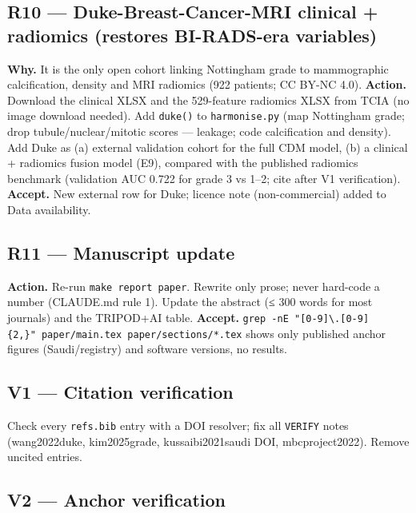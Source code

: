 \documentclass[
  10pt,
]{article}
\begin{document}
\hypertarget{r10-duke-breast-cancer-mri-clinical-radiomics-restores-bi-rads-era-variables}{%
\subsection{R10 --- Duke-Breast-Cancer-MRI clinical + radiomics
(restores BI-RADS-era
variables)}\label{r10-duke-breast-cancer-mri-clinical-radiomics-restores-bi-rads-era-variables}}

\textbf{Why.} It is the only open cohort linking Nottingham grade to
mammographic calcification, density and MRI radiomics (922 patients; CC
BY-NC 4.0). \textbf{Action.} Download the clinical XLSX and the
529-feature radiomics XLSX from TCIA (no image download needed). Add
\texttt{duke()} to \texttt{harmonise.py} (map Nottingham grade; drop
tubule/nuclear/mitotic scores --- leakage; code calcification and
density). Add Duke as (a) external validation cohort for the full CDM
model, (b) a clinical + radiomics fusion model (E9), compared with the
published radiomics benchmark (validation AUC 0.722 for grade 3 vs 1--2;
cite after V1 verification). \textbf{Accept.} New external row for Duke;
licence note (non-commercial) added to Data availability.

\hypertarget{r11-manuscript-update}{%
\subsection{R11 --- Manuscript update}\label{r11-manuscript-update}}

\textbf{Action.} Re-run \texttt{make\ report\ paper}. Rewrite only
prose; never hard-code a number (CLAUDE.md rule 1). Update the abstract
(≤ 300 words for most journals) and the TRIPOD+AI table.
\textbf{Accept.}
\texttt{grep\ -nE\ "{[}0-9{]}\textbackslash{}.{[}0-9{]}\{2,\}"\ paper/main.tex\ paper/sections/*.tex}
shows only published anchor figures (Saudi/registry) and software
versions, no results.

\hypertarget{v1-citation-verification}{%
\subsection{V1 --- Citation
verification}\label{v1-citation-verification}}

Check every \texttt{refs.bib} entry with a DOI resolver; fix all
\texttt{VERIFY} notes (wang2022duke, kim2025grade, kussaibi2021saudi
DOI, mbcproject2022). Remove uncited entries.

\hypertarget{v2-anchor-verification}{%
\subsection{V2 --- Anchor verification}\label{v2-anchor-verification}}
\end{document}
